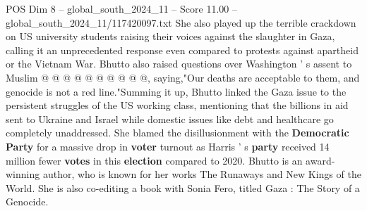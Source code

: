 \begin{textsample}{POS Dim 8 – global\_south\_2024\_11 – Score 11.00 – global\_south\_2024\_11/117420097.txt}
She also played up the terrible crackdown on US university students raising their voices against the slaughter in Gaza, calling it an unprecedented response even compared to protests against apartheid or the Vietnam War.
Bhutto also raised questions over Washington ' s assent to Muslim @ @ @ @ @ @ @ @ @ @, saying,"Our deaths are acceptable to them, and genocide is not a red line."Summing it up, Bhutto linked the Gaza issue to the persistent struggles of the US working class, mentioning that the billions in aid sent to Ukraine and Israel while domestic issues like debt and healthcare go completely unaddressed.
She blamed the disillusionment with the \textbf{Democratic} \textbf{Party} for a massive drop in \textbf{voter} turnout as Harris ' s \textbf{party} received 14 million fewer \textbf{votes} in this \textbf{election} compared to 2020.
Bhutto is an award-winning author, who is known for her works The Runaways and New Kings of the World.
She is also co-editing a book with Sonia Fero, titled Gaza : The Story of a Genocide.

\end{textsample}
